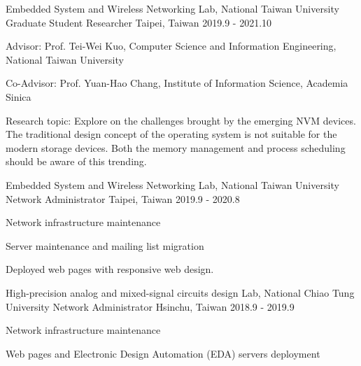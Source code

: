 

\begin{cventries}

  \cventry
    {Embedded System and Wireless Networking Lab, National Taiwan University} %
    {Graduate Student Researcher} %
    {Taipei, Taiwan} %
    {2019.9 - 2021.10} %
    {
      \begin{cvitems} %
        \item {Advisor: Prof. Tei-Wei Kuo, Computer Science and Information Engineering, National Taiwan University}
        \item {Co-Advisor: Prof. Yuan-Hao Chang, Institute of Information Science, Academia Sinica}
        \item {Research topic: Explore on the challenges brought by the emerging NVM devices. The traditional design concept of the operating system is not suitable for the modern storage devices. Both the memory management and process scheduling should be aware of this trending.}
      \end{cvitems}
    }
    
  \cventry
    {Embedded System and Wireless Networking Lab, National Taiwan University} %
    {Network Administrator} %
    {Taipei, Taiwan} %
    {2019.9 - 2020.8} %
    {
      \begin{cvitems} %
        \item {Network infrastructure maintenance}
        \item {Server maintenance and mailing list migration}
        \item {Deployed web pages with responsive web design.}
      \end{cvitems}
    }
    
  \cventry
    {High-precision analog and mixed-signal circuits design Lab, National Chiao Tung University} %
    {Network Administrator} %
    {Hsinchu, Taiwan} %
    {2018.9 - 2019.9} %
    {
      \begin{cvitems} %
        \item {Network infrastructure maintenance}
        \item {Web pages and Electronic Design Automation (EDA) servers deployment}
      \end{cvitems}
    }


\end{cventries}
